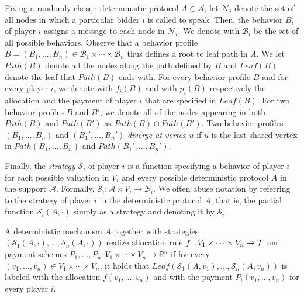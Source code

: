 Fixing a randomly chosen deterministic protocol $A\in \mathcal A$, let $\mathcal{N}_i$ denote the set of all nodes in which a particular bidder $i$ is called to speak.  Then, the behavior $B_i$ of player $i$ assigns a message to each node in $\mathcal{N}_i$. We denote with $\mathcal{B}_i$ be the set of all possible behaviors.  Observe that a behavior profile $B = (B_1,\dots, B_n) \in \mathcal B_1\times\cdots\times \mathcal B_n$ thus defines a root to leaf path in $A$.  We let $Path(B)$ denote all the nodes along the path defined by $B$ and $Leaf(B)$ denote the leaf
that $Path(B)$ ends with.  For every behavior profile $B$ and for every player $i$, we 
denote with $f_i(B)$ and with $p_i(B)$ respectively the allocation and the payment of player $i$ that are specified in $Leaf(B)$. For two behavior profiles $B$ and $B'$, we denote all of the nodes appearing in both $Path(B)$ and $Path(B')$ as $Path(B)\cap Path(B')$. Two behavior profiles $(B_1,\ldots,B_n)$ and $(B_1',\ldots,B_n')$ \emph{diverge at vertex $u$} if $u$ is the last shared vertex in $Path(B_1,\ldots,B_n)$ and $Path(B_1',\ldots,B_n')$.


Finally, the \emph{strategy} $\mathcal{S}_i$ of player $i$ is a function specifying a behavior of player $i$ for each possible valuation in $V_i$ and every possible deterministic protocol $A$ in the support $\mathcal A$. Formally, $\mathcal S_i:\mathcal A \times V_i\to\mathcal B_i$. We often abuse notation by referring to the strategy of player $i$ in the deterministic protocol $A$, that is, the partial function $\mathcal{S}_i(A, \cdot)$ simply as a strategy and denoting it by $\mathcal{S}_i$. 




A deterministic mechanism $A$ together with strategies $(\mathcal S_1(A,\cdot ),\ldots,\mathcal S_n(A,\cdot))$ realize allocation rule $f:V_1\times \cdots \times V_n \to \mathcal{T}$ and payment schemes $P_1,\ldots,P_n:V_1\times \cdots \times V_n \to \mathbb R^n$ if for every $(v_1,\ldots,v_n)\in V_1\times\cdots\times V_n$, it holds that $Leaf(\mathcal S_1(A,v_1),\ldots,\mathcal S_n(A,v_n))$ is labeled with the allocation $f(v_1,\ldots,v_n)$ and with the payment $P_i(v_1,\ldots,v_n)$ for every player $i$. 


